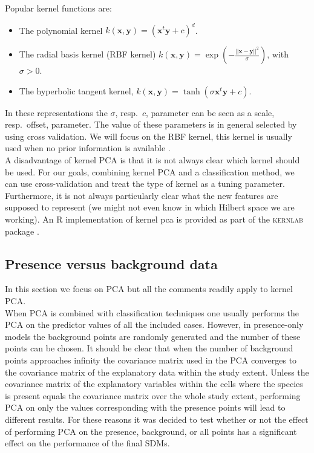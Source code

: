 Popular kernel functions are:
\begin{itemize}
\item The polynomial kernel $k(\bm{x},\bm{y}) = (\bm{x}^t \bm{y} + c)^d$.
\item The radial basis kernel (RBF kernel) $k(\bm{x},\bm{y}) = \exp{\left(-\frac{\vert \vert \bm{x} -\bm{y}\vert \vert ^2}{\sigma}\right)}$, with $\sigma > 0$. 
\item The hyperbolic tangent kernel, $k(\bm{x},\bm{y}) = \tanh{(\sigma \bm{x}^t \bm{y} + c)}$.
\end{itemize}
In these representations the $\sigma$, resp.\ $c$, parameter can be seen as a scale, resp.\ offset, parameter. The value of these parameters is in general selected by using cross validation. We will focus on the RBF kernel, this kernel is usually used when no prior information is available \parencite{JSSv011i09}.  \\

A disadvantage of kernel PCA is that it is not always clear which kernel should be used. For our goals, combining kernel PCA and a classification method, we can use cross-validation and treat the type of kernel as a tuning parameter. Furthermore, it is not always particularly clear what the new features are supposed to represent (we might not even know in which Hilbert space we are working). An R implementation of kernel pca is provided as part of the \textsc{kernlab} package \parencite{JSSv011i09}.

\subsection{Presence versus background data}
\label{sec:dimRedPrVSBG}
In this section we focus on PCA but all the comments readily apply to kernel PCA.\\

When PCA is combined with classification techniques one usually performs the PCA on the predictor values of all the included cases. However, in presence-only models the background points are randomly generated and the number of these points can be chosen. It should be clear that when the number of background points approaches infinity the covariance matrix used in the PCA converges to the covariance matrix of the explanatory data within the study extent. Unless the covariance matrix of the explanatory variables within the cells where the species is present equals the covariance matrix over the whole study extent, performing PCA on only the values corresponding with the presence points will lead to different results. For these reasons it was decided to test whether or not the effect of performing PCA on the presence, background, or all points has a significant effect on the performance of the final SDMs.

